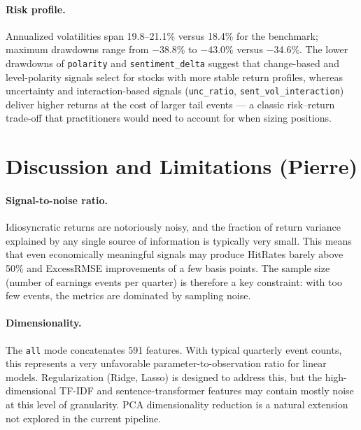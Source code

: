 \documentclass{article}
\begin{document}
\paragraph{Risk profile.}
Annualized volatilities span 19.8--21.1\% versus 18.4\% for the benchmark; maximum drawdowns range from $-$38.8\% to $-$43.0\% versus $-$34.6\%. The lower drawdowns of \texttt{polarity} and \texttt{sentiment\_delta} suggest that change-based and level-polarity signals select for stocks with more stable return profiles, whereas uncertainty and interaction-based signals (\texttt{unc\_ratio}, \texttt{sent\_vol\_interaction}) deliver higher returns at the cost of larger tail events — a classic risk--return trade-off that practitioners would need to account for when sizing positions.


\section{Discussion and Limitations (Pierre)}

\paragraph{Signal-to-noise ratio.}
Idiosyncratic returns are notoriously noisy, and the fraction of return variance explained by any single source of information is typically very small. This means that even economically meaningful signals may produce HitRates barely above 50\% and ExcessRMSE improvements of a few basis points. The sample size (number of earnings events per quarter) is therefore a key constraint: with too few events, the metrics are dominated by sampling noise.

\paragraph{Dimensionality.}
The \texttt{all} mode concatenates 591 features. With typical quarterly event counts, this represents a very unfavorable parameter-to-observation ratio for linear models. Regularization (Ridge, Lasso) is designed to address this, but the high-dimensional TF-IDF and sentence-transformer features may contain mostly noise at this level of granularity. PCA dimensionality reduction is a natural extension not explored in the current pipeline.

\end{document}
